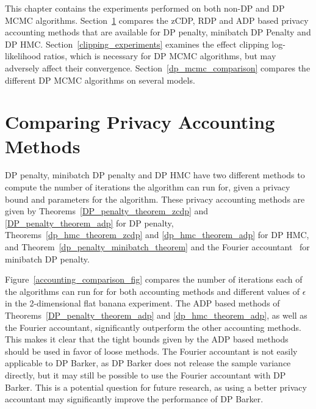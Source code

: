 \documentclass[english,twoside,openright]{HYgraduMLDS}
\begin{document}
This chapter contains the experiments performed on both non-DP and DP MCMC
algorithms. Section~\ref{accounting_comparison_section} compares the
zCDP, RDP and ADP based privacy accounting methods that are available
for DP penalty, minibatch DP Penalty and DP HMC.
Section~\ref{clipping_experiments}
examines the effect clipping log-likelihood ratios, which is necessary for
DP MCMC algorithms, but may adversely affect their convergence.
Section~\ref{dp_mcmc_comparison} compares the different DP MCMC algorithms
on several models.

\section{Comparing Privacy Accounting Methods}\label{accounting_comparison_section}

DP penalty, minibatch DP penalty and DP HMC have two different methods to
compute the number of iterations the algorithm can run for, given a privacy
bound and parameters for the algorithm. These privacy accounting methods
are given by Theorems~\ref{DP_penalty_theorem_zcdp} and
\ref{DP_penalty_theorem_adp} for DP penalty, Theorems~\ref{dp_hmc_theorem_zcdp}
and \ref{dp_hmc_theorem_adp} for DP HMC, and
Theorem~\ref{dp_penalty_minibatch_theorem} and the Fourier
accountant~\cite{KJH20} for minibatch DP penalty.

Figure~\ref{accounting_comparison_fig} compares the number of iterations
each of the algorithms can run for for both accounting methods and different
values of \(\epsilon\) in the 2-dimensional flat banana experiment.
The ADP based methods of Theorems~\ref{DP_penalty_theorem_adp}
and \ref{dp_hmc_theorem_adp}, as well as the Fourier accountant, significantly
outperform the other accounting methods. This makes it clear that the tight
bounds given by the ADP based methods should be used in favor of loose methods.
The Fourier accountant is not easily applicable to DP Barker, as DP Barker
does not release the sample variance directly, but it may still be possible
to use the Fourier accountant with DP Barker. This is a potential question
for future research, as using a better privacy accountant may significantly
improve the performance of DP Barker.
\end{document}
